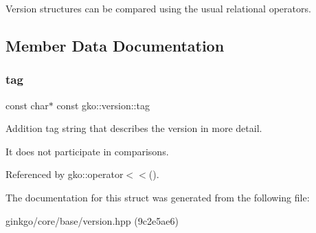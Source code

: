 Version structures can be compared using the usual relational operators. 

\subsection{Member Data Documentation}
\mbox{\label{structgko_1_1version_a1bd0eaa4d551c145ff9cd0c10e555ac3}} 
\subsubsection{\texorpdfstring{tag}{tag}}
{\footnotesize\ttfamily const char$\ast$ const gko\+::version\+::tag}



Addition tag string that describes the version in more detail. 

It does not participate in comparisons. 

Referenced by gko\+::operator$<$$<$().



The documentation for this struct was generated from the following file\+:\begin{DoxyCompactItemize}
\item 
ginkgo/core/base/version.\+hpp (9c2e5ae6)\end{DoxyCompactItemize}
